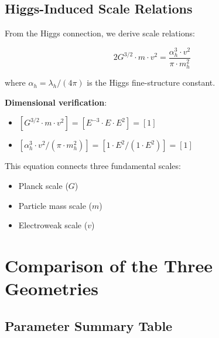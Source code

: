\documentclass[12pt,a4paper]{article}
\begin{document}
	\subsection{Higgs-Induced Scale Relations}
	\label{subsec:higgs_scale_relations}
	
	From the Higgs connection, we derive scale relations:
	
	\begin{equation}
		2G^{3/2} \cdot m \cdot v^2 = \frac{\alpha_h^3 \cdot v^2}{\pi \cdot m_h^2}
	\end{equation}
	
	where $\alpha_h = \lambda_h/(4\pi)$ is the Higgs fine-structure constant.
	
	\textbf{Dimensional verification}:
	\begin{itemize}
		\item $[G^{3/2} \cdot m \cdot v^2] = [E^{-3} \cdot E \cdot E^2] = [1]$
		\item $[\alpha_h^3 \cdot v^2/(\pi \cdot m_h^2)] = [1 \cdot E^2/(1 \cdot E^2)] = [1]$ \checkmark
	\end{itemize}
	
	This equation connects three fundamental scales:
	\begin{itemize}
		\item Planck scale ($G$)
		\item Particle mass scale ($m$)
		\item Electroweak scale ($v$)
	\end{itemize}
	
	\section{Comparison of the Three Geometries}
	\label{sec:geometry_comparison}
	
	\subsection{Parameter Summary Table}
	\label{subsec:parameter_summary}
	
\end{document}
